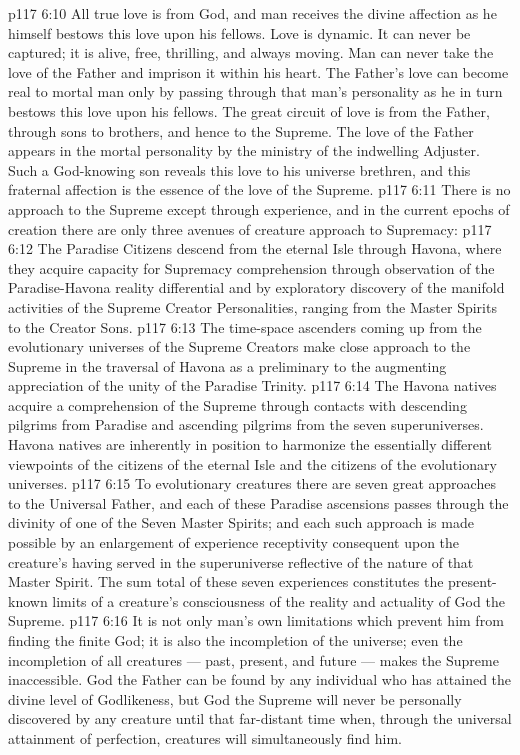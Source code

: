 \vs p117 6:10 All true love is from God, and man receives the divine affection as he himself bestows this love upon his fellows. Love is dynamic. It can never be captured; it is alive, free, thrilling, and always moving. Man can never take the love of the Father and imprison it within his heart. The Father’s love can become real to mortal man only by passing through that man’s personality as he in turn bestows this love upon his fellows. The great circuit of love is from the Father, through sons to brothers, and hence to the Supreme. The love of the Father appears in the mortal personality by the ministry of the indwelling Adjuster. Such a God\hyp{}knowing son reveals this love to his universe brethren, and this fraternal affection is the essence of the love of the Supreme.
\vs p117 6:11 \pc There is no approach to the Supreme except through experience, and in the current epochs of creation there are only three avenues of creature approach to Supremacy:
\vs p117 6:12 \bibnobreakspace The Paradise Citizens descend from the eternal Isle through Havona, where they acquire capacity for Supremacy comprehension through observation of the Paradise\hyp{}Havona reality differential and by exploratory discovery of the manifold activities of the Supreme Creator Personalities, ranging from the Master Spirits to the Creator Sons.
\vs p117 6:13 \bibnobreakspace The time\hyp{}space ascenders coming up from the evolutionary universes of the Supreme Creators make close approach to the Supreme in the traversal of Havona as a preliminary to the augmenting appreciation of the unity of the Paradise Trinity.
\vs p117 6:14 \bibnobreakspace The Havona natives acquire a comprehension of the Supreme through contacts with descending pilgrims from Paradise and ascending pilgrims from the seven superuniverses. Havona natives are inherently in position to harmonize the essentially different viewpoints of the citizens of the eternal Isle and the citizens of the evolutionary universes.
\vs p117 6:15 \pc To evolutionary creatures there are seven great approaches to the Universal Father, and each of these Paradise ascensions passes through the divinity of one of the Seven Master Spirits; and each such approach is made possible by an enlargement of experience receptivity consequent upon the creature’s having served in the superuniverse reflective of the nature of that Master Spirit. The sum total of these seven experiences constitutes the present\hyp{}known limits of a creature’s consciousness of the reality and actuality of God the Supreme.
\vs p117 6:16 It is not only man’s own limitations which prevent him from finding the finite God; it is also the incompletion of the universe; even the incompletion of all creatures --- past, present, and future --- makes the Supreme inaccessible. God the Father can be found by any individual who has attained the divine level of Godlikeness, but God the Supreme will never be personally discovered by any  creature until that far\hyp{}distant time when, through the universal attainment of perfection,  creatures will simultaneously find him.
